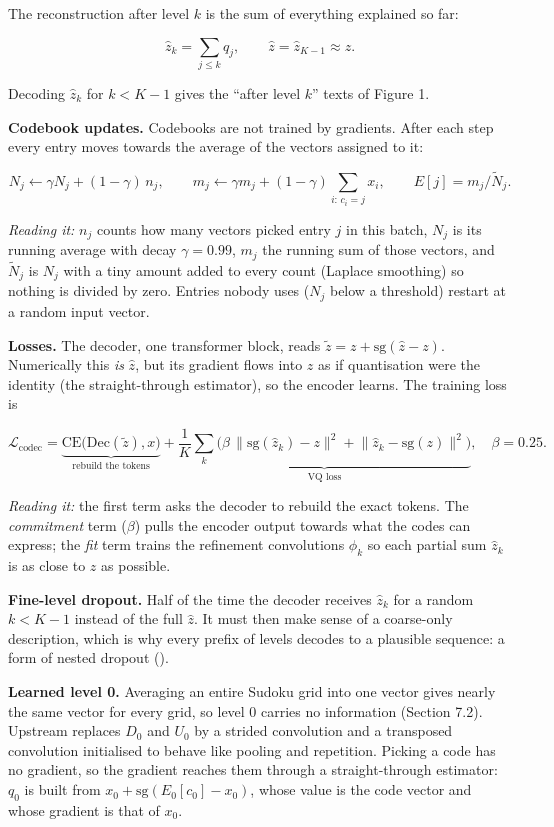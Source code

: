 \documentclass[
  british,
]{article}
\begin{document}
The reconstruction after level \(k\) is the sum of everything explained
so far:

\[\hat z_k = \sum_{j \le k} q_j, \qquad \hat z = \hat z_{K-1} \approx z .\]

Decoding \(\hat z_k\) for \(k < K-1\) gives the ``after level \(k\)''
texts of Figure 1.

\textbf{Codebook updates.} Codebooks are not trained by gradients. After
each step every entry moves towards the average of the vectors assigned
to it:

\[N_j \leftarrow \gamma N_j + (1-\gamma)\, n_j, \qquad m_j \leftarrow \gamma m_j + (1-\gamma) \sum_{i:\,c_i = j} x_i, \qquad E[j] = m_j / \tilde N_j .\]

\emph{Reading it:} \(n_j\) counts how many vectors picked entry \(j\) in
this batch, \(N_j\) is its running average with decay \(\gamma = 0.99\),
\(m_j\) the running sum of those vectors, and \(\tilde N_j\) is \(N_j\)
with a tiny amount added to every count (Laplace smoothing) so nothing
is divided by zero. Entries nobody uses (\(N_j\) below a threshold)
restart at a random input vector.

\textbf{Losses.} The decoder, one transformer block, reads
\(\tilde z = z + \mathrm{sg}(\hat z - z)\). Numerically this \emph{is}
\(\hat z\), but its gradient flows into \(z\) as if quantisation were
the identity (the straight-through estimator), so the encoder learns.
The training loss is

\[\mathcal{L}_{\mathrm{codec}} = \underbrace{\mathrm{CE}\big(\mathrm{Dec}(\tilde z), x\big)}_{\text{rebuild the tokens}} + \underbrace{\frac{1}{K}\sum_k \Big(\beta\,\lVert \mathrm{sg}(\hat z_k) - z\rVert^2 + \lVert \hat z_k - \mathrm{sg}(z) \rVert^2\Big)}_{\text{VQ loss}}, \quad \beta = 0.25 .\]

\emph{Reading it:} the first term asks the decoder to rebuild the exact
tokens. The \emph{commitment} term (\(\beta\)) pulls the encoder output
towards what the codes can express; the \emph{fit} term trains the
refinement convolutions \(\phi_k\) so each partial sum \(\hat z_k\) is
as close to \(z\) as possible.

\textbf{Fine-level dropout.} Half of the time the decoder receives
\(\hat z_k\) for a random \(k < K-1\) instead of the full \(\hat z\). It
must then make sense of a coarse-only description, which is why every
prefix of levels decodes to a plausible sequence: a form of nested
dropout ().

\textbf{Learned level 0.} Averaging an entire Sudoku grid into one
vector gives nearly the same vector for every grid, so level 0 carries
no information (Section 7.2). Upstream replaces \(D_0\) and \(U_0\) by a
strided convolution and a transposed convolution initialised to behave
like pooling and repetition. Picking a code has no gradient, so the
gradient reaches them through a straight-through estimator: \(q_0\) is
built from \(x_0 + \mathrm{sg}(E_0[c_0] - x_0)\), whose value is the
code vector and whose gradient is that of \(x_0\).
\end{document}
